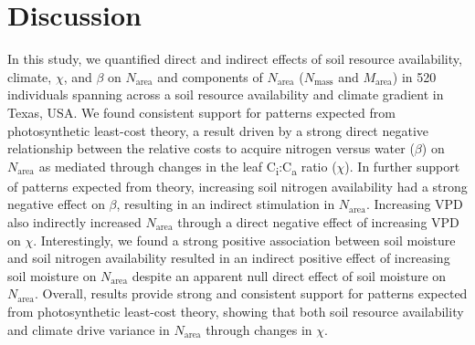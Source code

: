 \section{Discussion}
In this study, we quantified direct and indirect effects of soil resource availability, climate, $\chi$, and $\beta$ on $N_\mathrm{area}$ and components of $N_\mathrm{area}$ ($N_\mathrm{mass}$ and $M_\mathrm{area}$) in 520 individuals spanning across a soil resource availability and climate gradient in Texas, USA. We found consistent support for patterns expected from photosynthetic least-cost theory, a result driven by a strong direct negative relationship between the relative costs to acquire nitrogen versus water ($\beta$) on $N_\mathrm{area}$ as mediated through changes in the leaf C\textsubscript{i}:C\textsubscript{a} ratio ($\chi$). In further support of patterns expected from theory, increasing soil nitrogen availability had a strong negative effect on $\beta$, resulting in an indirect stimulation in $N_\mathrm{area}$. Increasing VPD also indirectly increased $N_\mathrm{area}$ through a direct negative effect of increasing VPD on $\chi$. Interestingly, we found a strong positive association between soil moisture and soil nitrogen availability resulted in an indirect positive effect of increasing soil moisture on $N_\mathrm{area}$ despite an apparent null direct effect of soil moisture on $N_\mathrm{area}$. Overall, results provide strong and consistent support for patterns expected from photosynthetic least-cost theory, showing that both soil resource availability and climate drive variance in $N_\mathrm{area}$ through changes in $\chi$.

